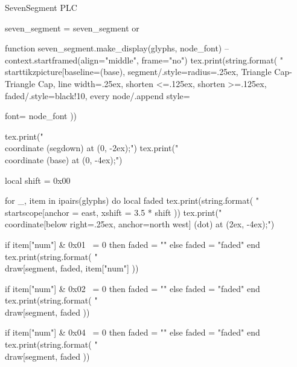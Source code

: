 \startenvironment SevenSegment
\environment PLC

\usemodule[tikz]

\startluacode
    seven_segment = seven_segment or {}

    function seven_segment.make_display(glyphs, node_font)
        -- context.startframed({align="middle", frame="no"})
        tex.print(string.format(
        "\\starttikzpicture[baseline=(base), segment/.style={radius=.25ex, Triangle Cap-Triangle Cap, line width=.25ex, shorten <=.125ex, shorten >=.125ex}, faded/.style={black!10}, every node/.append style={font=%
        node_font
        ))

        tex.print("\\coordinate (segdown) at (0, -2ex);")
        tex.print("\\coordinate (base) at (0, -4ex);")
    
        local shift = 0x00
    
        for _, item in ipairs(glyphs) do
            local faded
            tex.print(string.format(
               "\\startscope[anchor = east, xshift = %
               3.5 * shift
            ))
            tex.print("\\coordinate[below right=.25ex, anchor=north west] (dot) at (2ex, -4ex);")

            if item["num"] & 0x01 ~= 0 then
                faded = ""
            else
                faded = "faded"
            end
            tex.print(string.format(
                "\\draw[segment, %
                faded,
                item["num"]
            ))

            if item["num"] & 0x02 ~= 0 then
                faded = ""
            else
                faded = "faded"
            end
            tex.print(string.format(
                "\\draw[segment, %
                faded
            ))

            if item["num"] & 0x04 ~= 0 then
                faded = ""
            else
                faded = "faded"
            end
            tex.print(string.format(
                "\\draw[segment, %
                faded
            ))

}
